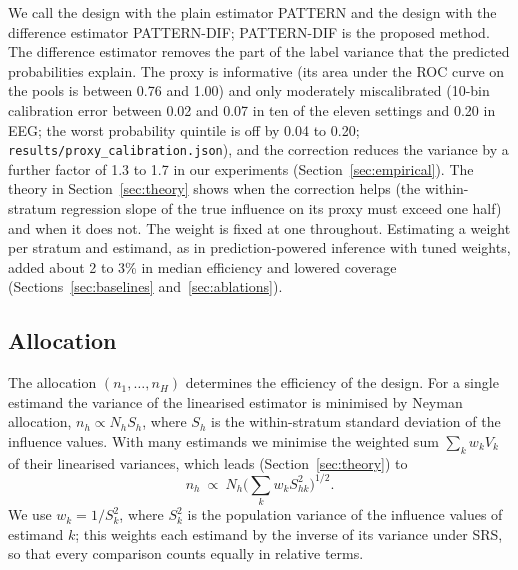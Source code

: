We call the design with the plain estimator PATTERN and the design with the difference estimator PATTERN-DIF; PATTERN-DIF is the proposed method. The difference estimator removes the part of the label variance that the predicted probabilities explain. The proxy is informative (its area under the ROC curve on the pools is between 0.76 and 1.00) and only moderately miscalibrated (10-bin calibration error between 0.02 and 0.07 in ten of the eleven settings and 0.20 in EEG; the worst probability quintile is off by 0.04 to 0.20; \texttt{results/proxy\_calibration.json}), and the correction reduces the variance by a further factor of 1.3 to 1.7 in our experiments (Section~\ref{sec:empirical}). The theory in Section~\ref{sec:theory} shows when the correction helps (the within-stratum regression slope of the true influence on its proxy must exceed one half) and when it does not. The weight is fixed at one throughout. Estimating a weight per stratum and estimand, as in prediction-powered inference with tuned weights, added about 2 to 3\% in median efficiency and lowered coverage (Sections~\ref{sec:baselines} and~\ref{sec:ablations}).

\subsection{Allocation}
The allocation $(n_1,\dots,n_H)$ determines the efficiency of the design. For a single estimand the variance of the linearised estimator is minimised by Neyman allocation, $n_h\propto N_h S_h$, where $S_h$ is the within-stratum standard deviation of the influence values. With many estimands we minimise the weighted sum $\sum_k w_k V_k$ of their linearised variances, which leads (Section~\ref{sec:theory}) to
\begin{equation}\label{eq:alloc}
n_h\ \propto\ N_h\Big(\sum_k w_k S^2_{hk}\Big)^{1/2}.
\end{equation}
We use $w_k=1/S_k^2$, where $S_k^2$ is the population variance of the influence values of estimand $k$; this weights each estimand by the inverse of its variance under SRS, so that every comparison counts equally in relative terms.

